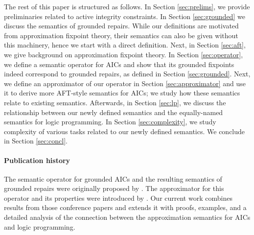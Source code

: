 The rest of this paper is structured as follows. In Section \ref{sec:prelims}, we provide preliminaries related to active integrity constraints. 
In Section \ref{sec:grounded} we discuss the semantics of grounded repairs. While our definitions are motivated from approximation fixpoint theory, their semantics can also be given without this machinery, hence we start with a direct definition. 
Next, in Section \ref{sec:aft}, we give background on approximation fixpoint theory. 
In Section \ref{sec:operator}, we define a semantic operator for AICs and show that its grounded fixpoints indeed correspond to grounded repairs, as defined in Section \ref{sec:grounded}.
Next, we define an approximator of our operator in Section \ref{sec:approximator} and use it to derive more AFT-style semantics for AICs; we study how these semantics relate to existing semantics. 
Afterwards, in Section \ref{sec:lp}, we discuss the relationship between our newly defined semantics and the equally-named semantics for logic programming. 
In Section \ref{sec:complexity}, we study complexity of various tasks related to our newly defined semantics. We conclude in Section \ref{sec:concl}.


\paragraph{Publication history}
The semantic operator for grounded AICs and the resulting semantics of grounded repairs were originally proposed by \citet{iclp/Cruz-Filipe16}.
The approximator for this operator and its properties were introduced by \citet{ijcai/BogaertsC17}.
Our current work combines results from those conference papers and extends it with proofs, examples, and a detailed analysis of the connection between the approximation semantics for AICs and logic programming.


